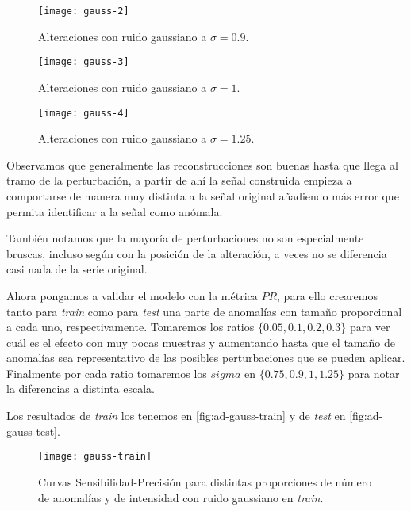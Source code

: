 \begin{figure}[htpb]
  \centering
  \texttt{[image: gauss-2]}
  \caption{Alteraciones con ruido gaussiano a $\sigma = 0.9$.}
  \label{fig:ad-gauss-2}
\end{figure}

\begin{figure}[htpb]
  \centering
  \texttt{[image: gauss-3]}
  \caption{Alteraciones con ruido gaussiano a $\sigma = 1$.}
  \label{fig:ad-gauss-3}
\end{figure}

\begin{figure}[htpb]
  \centering
  \texttt{[image: gauss-4]}
  \caption{Alteraciones con ruido gaussiano a $\sigma = 1.25$.}
  \label{fig:ad-gauss-4}
\end{figure}

Observamos que generalmente las reconstrucciones son buenas hasta que llega al tramo de la perturbación, a partir de ahí la señal construida empieza a comportarse de manera muy distinta a la señal original añadiendo más error que permita identificar a la señal como anómala.

También notamos que la mayoría de perturbaciones no son especialmente bruscas, incluso según con la posición de la alteración, a veces no se diferencia casi nada
de la serie original.

Ahora pongamos a validar el modelo con la métrica $PR$, para ello crearemos tanto para \emph{train} como para \emph{test} una parte de anomalías con tamaño proporcional a cada uno, respectivamente. Tomaremos los ratios $\{0.05, 0.1, 0.2, 0.3\}$ para ver cuál es el efecto con muy pocas muestras y aumentando hasta que el tamaño de anomalías sea representativo de las posibles perturbaciones que se pueden aplicar. Finalmente por cada ratio tomaremos los $sigma$ en $\{0.75, 0.9, 1, 1.25\}$ para notar la diferencias a distinta escala.

Los resultados de \emph{train} los tenemos en \autoref{fig:ad-gauss-train} y de \emph{test} en \autoref{fig:ad-gauss-test}.

\begin{figure}[htpb]
  \centering
  \texttt{[image: gauss-train]}
  \caption{Curvas Sensibilidad-Precisión para distintas proporciones de número de anomalías y de intensidad con ruido gaussiano en \emph{train}.}
  \label{fig:ad-gauss-train}
\end{figure}

